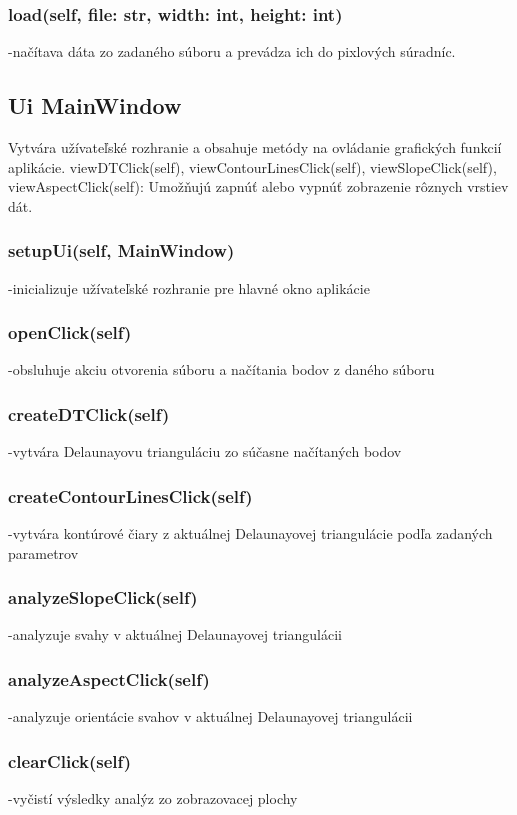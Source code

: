 \documentclass[12pt]{article}
\begin{document}
\subsubsection*{load(self, file: str, width: int, height: int)}
\noindent-načítava dáta zo zadaného súboru a prevádza ich do pixlových súradníc.
\subsection*{Ui \textunderscore MainWindow}
Vytvára užívateľské rozhranie a obsahuje metódy na ovládanie grafických funkcií aplikácie. 
viewDTClick(self), viewContourLinesClick(self), viewSlopeClick(self), viewAspectClick(self):
Umožňujú zapnúť alebo vypnúť zobrazenie rôznych vrstiev dát.
\subsubsection*{setupUi(self, MainWindow)}
\noindent-inicializuje užívateľské rozhranie pre hlavné okno aplikácie
\subsubsection*{openClick(self)}
\noindent-obsluhuje akciu otvorenia súboru a načítania bodov z daného súboru
\subsubsection*{createDTClick(self)}
\noindent-vytvára Delaunayovu trianguláciu zo súčasne načítaných bodov
\subsubsection*{createContourLinesClick(self)}
\noindent-vytvára kontúrové čiary z aktuálnej Delaunayovej triangulácie podľa zadaných parametrov
\subsubsection*{analyzeSlopeClick(self)}
\noindent-analyzuje svahy v aktuálnej Delaunayovej triangulácii
\subsubsection*{analyzeAspectClick(self)}
\noindent-analyzuje orientácie svahov v aktuálnej Delaunayovej triangulácii
\subsubsection*{clearClick(self)}
\noindent-vyčistí výsledky analýz zo zobrazovacej plochy
\end{document}
